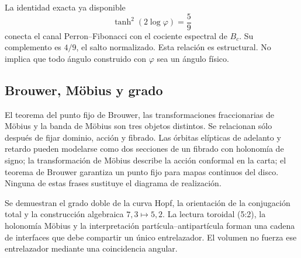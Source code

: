 La identidad exacta ya disponible
\[
\tanh^2(2\log\varphi)=\frac59
\]
conecta el canal Perron--Fibonacci con el cociente espectral de \(B_c\). Su
complemento es \(4/9\), el salto normalizado. Esta relación es estructural.
No implica que todo ángulo construido con \(\varphi\) sea un ángulo físico.

\subsection{Brouwer, Möbius y grado}

El teorema del punto fijo de Brouwer, las transformaciones fraccionarias de
Möbius y la banda de Möbius son tres objetos distintos. Se relacionan sólo
después de fijar dominio, acción y fibrado. Las órbitas elípticas de adelanto y
retardo pueden modelarse como dos secciones de un fibrado con holonomía de
signo; la transformación de Möbius describe la acción conformal en la carta;
el teorema de Brouwer garantiza un punto fijo para mapas continuos del disco.
Ninguna de estas frases sustituye el diagrama de realización.

\begin{fronteraBox}[title={Resultado y frontera}]
Se demuestran el grado doble de la curva Hopf, la orientación de la
conjugación total y la construcción algebraica \(7,3\mapsto5,2\). La lectura
toroidal (5{:}2), la holonomía Möbius y la interpretación
partícula--antipartícula forman una cadena de interfaces que debe compartir un
único entrelazador. El volumen no fuerza ese entrelazador mediante una
coincidencia angular.
\end{fronteraBox}
